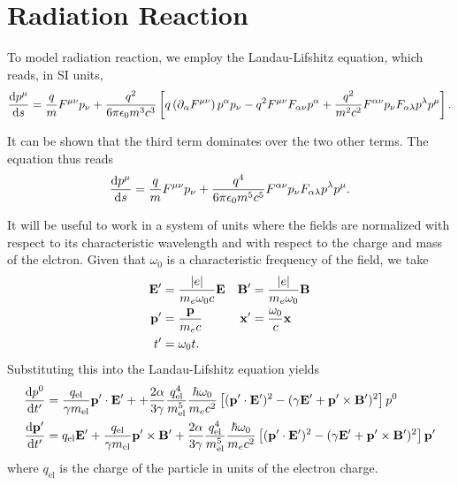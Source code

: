 \documentclass[10pt,letterpaper,extrafontsizes, onecolumn,openright]{memoir}
\begin{document}
\section{Radiation Reaction}

To model radiation reaction, we employ the Landau-Lifshitz equation, which
reads, in SI units,
  \begin{equation}
    \dv{p^\mu}{s} = \frac{q}{m}F^{\mu\nu}p_\nu
                   +\frac{q^2}{6\pi\epsilon_0m^3c^3}
                      \left[
                        q\left(\partial_\alpha F^{\mu\nu}\right)p^\alpha p_\nu
                      - q^2 F^{\mu\nu}F_{\alpha\nu}p^\alpha
                      + \frac{q^2}{m^2c^2} F^{\alpha\nu}p_\nu F_{\alpha\lambda}p^\lambda p^\mu
                      \right].
  \end{equation}

It can be shown \cite{} that the third term dominates over the two other terms.
The equation thus reads
  \begin{equation}
    \dv{p^\mu}{s} = \frac{q}{m}F^{\mu\nu}p_\nu
                   +\frac{q^4}{6\pi\epsilon_0m^5c^5}F^{\alpha\nu}p_\nu F_{\alpha\lambda}p^\lambda p^\mu.
  \end{equation}

It will be useful to work in a system of units where the fields are normalized with
respect to its characteristic wavelength and with respect to the charge and mass
of the elctron. Given that $\omega_0$ is a characteristic frequency of the field,
we take
  \begin{subequations}
  \begin{align}
    \vb{E}' &= \frac{|e|}{m_e\omega_0 c} \vb{E} & \vb{B}' &= \frac{|e|}{m_e\omega_0}\vb{B} \\
    \vb{p}' &= \frac{\vb{p}}{m_ec}              & \vb{x}' &= \frac{\omega_0}{c}\vb{x}    \\
    t'      &= \omega_0 t.
  \end{align}
  \end{subequations}
Substituting this into the Landau-Lifshitz equation yields
  \begin{align}
    \dv{p^0}{t'}     &= \frac{q_\text{el}}{\gamma m_\text{el}}\vb{p}'\cdot\vb{E}'
                       ++\frac{2\alpha}{3\gamma}\frac{q_\text{el}^4}{m_\text{el}^5}\frac{\hbar\omega_0}{m_ec^2}
                      \left[(\vb{p}'\cdot\vb{E}')^2-(\gamma\vb{E}'+\vb{p}'\times\vb{B}')^2\right]p^0 \\
    \dv{\vb{p}'}{t'} &= q_\text{el}\vb{E}' +\frac{q_\text{el}}{\gamma m_\text{el}}\vb{p}'\times\vb{B}'
                      +\frac{2\alpha}{3\gamma}\frac{q_\text{el}^4}{m_\text{el}^5}\frac{\hbar\omega_0}{m_ec^2}
                      \left[(\vb{p}'\cdot\vb{E}')^2-(\gamma\vb{E}'+\vb{p}'\times\vb{B}')^2\right]\vb{p}'
  \end{align}
where $q_\text{el}$ is the charge of the particle in units of the electron charge.
\end{document}

